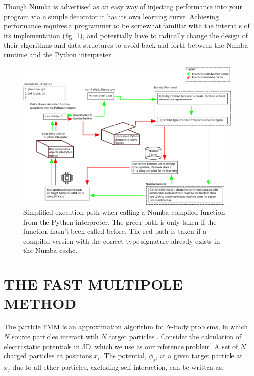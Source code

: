 \documentclass{IEEEcsmag}
\begin{document}
Though Numba is advertised as an easy way of injecting performance into your program via a simple decorator it has its own learning curve. Achieving performance requires a programmer to be somewhat familiar with the internals of its implementation (fig. \ref{fig:numba}), and potentially have to radically change the design of their algorithms and data structures to avoid back and forth between the Numba runtime and the Python interpreter.

\begin{figure}
    \centerline{\includegraphics {figures/numba.pdf}}
    \caption{Simplified execution path when calling a Numba compiled function from the Python interpreter. The green path is only taken if the function hasn't been called before. The red path is taken if a compiled version with the correct type signature already exists in the Numba cache.}
    \label{fig:numba}
\end{figure}



\section{THE FAST MULTIPOLE METHOD}

The particle FMM is an approximation algorithm for $N$-body problems, in which $N$ source particles interact with $N$ target particles \cite{Greengard1987}. Consider the calculation of electrostatic potentials in 3D, which we use as our reference problem. A set of $N$ charged particles at positions $x_i$. The potential, $\phi_j$, at a given target particle at $x_j$ due to all other particles, excluding self interaction, can be written as.
\end{document}
